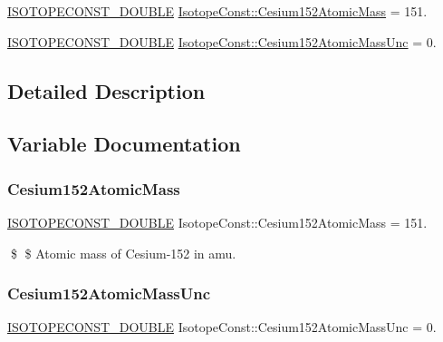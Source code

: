 \begin{DoxyCompactItemize}
\item 
\mbox{\hyperlink{group___isotope_const-_macros_ga8f45a7272ce02c0b4c65c44636ed719a}{I\+S\+O\+T\+O\+P\+E\+C\+O\+N\+S\+T\+\_\+\+D\+O\+U\+B\+LE}} \mbox{\hyperlink{group___isotope_const-_cesium-_cs152_gacf10e12b59ec6023d453cc638057b296}{Isotope\+Const\+::\+Cesium152\+Atomic\+Mass}} = 151.
\item 
\mbox{\hyperlink{group___isotope_const-_macros_ga8f45a7272ce02c0b4c65c44636ed719a}{I\+S\+O\+T\+O\+P\+E\+C\+O\+N\+S\+T\+\_\+\+D\+O\+U\+B\+LE}} \mbox{\hyperlink{group___isotope_const-_cesium-_cs152_gab82223e2a33f02ef23f94954c2b26d9d}{Isotope\+Const\+::\+Cesium152\+Atomic\+Mass\+Unc}} = 0.
\end{DoxyCompactItemize}


\subsection{Detailed Description}


\subsection{Variable Documentation}
\mbox{\label{group___isotope_const-_cesium-_cs152_gacf10e12b59ec6023d453cc638057b296}} 
\subsubsection{\texorpdfstring{Cesium152\+Atomic\+Mass}{Cesium152AtomicMass}}
{\footnotesize\ttfamily \mbox{\hyperlink{group___isotope_const-_macros_ga8f45a7272ce02c0b4c65c44636ed719a}{I\+S\+O\+T\+O\+P\+E\+C\+O\+N\+S\+T\+\_\+\+D\+O\+U\+B\+LE}} Isotope\+Const\+::\+Cesium152\+Atomic\+Mass = 151.}

\$ \$ Atomic mass of Cesium-\/152 in amu. \mbox{\label{group___isotope_const-_cesium-_cs152_gab82223e2a33f02ef23f94954c2b26d9d}} 
\subsubsection{\texorpdfstring{Cesium152\+Atomic\+Mass\+Unc}{Cesium152AtomicMassUnc}}
{\footnotesize\ttfamily \mbox{\hyperlink{group___isotope_const-_macros_ga8f45a7272ce02c0b4c65c44636ed719a}{I\+S\+O\+T\+O\+P\+E\+C\+O\+N\+S\+T\+\_\+\+D\+O\+U\+B\+LE}} Isotope\+Const\+::\+Cesium152\+Atomic\+Mass\+Unc = 0.}

